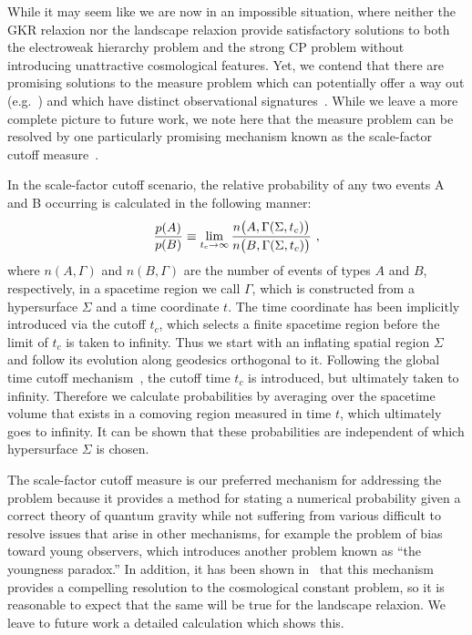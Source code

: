 \documentclass[12pt,aps,prd,showpacs,notitlepage,nofootinbib]{revtex4-1}
\newcommand{\beq}{\begin{equation}}
\newcommand{\eeq}{\end{equation}}
\begin{document}
While it may seem like we are now in an impossible situation, where neither the GKR relaxion nor the landscape relaxion provide satisfactory solutions to both the electroweak hierarchy problem and the strong CP problem without introducing unattractive cosmological features. Yet, we contend that there are promising solutions to the measure problem which can potentially offer a way out (e.g.~\cite{PhysRevD.50.730,PhysRevD.52.3365,PhysRevD.60.023501}) and which have distinct observational signatures~\cite{PhysRevD.78.063520}. While we leave a more complete picture to future work, we note here that the measure problem can be resolved by one particularly promising mechanism known as the scale-factor cutoff measure~\cite{PhysRevD.78.063520}.

In the scale-factor cutoff scenario, the relative probability of any two events A and B occurring is calculated in the following manner:
\beq
{p(A) \over p(B)} \equiv \lim_{t_c \to \infty} {{n\bigl(A,
\Gamma(\Sigma, t_c)\bigr)} \over {n\bigl(B, \Gamma(\Sigma,
t_c)\bigr)}} \ ,
\eeq
where $n(A,\Gamma)$ and $n(B,\Gamma)$ are the number of events of
types $A$ and $B$, respectively, in a spacetime region we call $\Gamma$, which is constructed from a hypersurface $\Sigma$ and a time coordinate $t$. The time coordinate has been implicitly introduced via the cutoff $t_{c}$, which selects a finite spacetime region before the limit of $t_{c}$ is taken to infinity. Thus we start with an inflating spatial region $\Sigma$ and follow its evolution along geodesics orthogonal to it. Following the global time cutoff mechanism~\cite{PhysRevD.50.730,PhysRevD.51.429,PhysRevD.52.6730}, the cutoff time $t_{c}$ is introduced, but ultimately taken to infinity. Therefore we calculate probabilities by averaging over the spacetime volume that exists in a comoving region measured in time $t$, which ultimately goes to infinity. It can be shown that these probabilities are independent of which hypersurface $\Sigma$ is chosen.

 The scale-factor cutoff measure is our preferred mechanism for addressing the problem because it provides a method for stating a numerical probability given a correct theory of quantum gravity while not suffering from various difficult to resolve issues that arise in other mechanisms, for example the problem of bias toward young observers, which introduces another problem known as ``the youngness paradox.'' In addition, it has been shown in~\cite{PhysRevD.78.063520} that this mechanism provides a compelling resolution to the cosmological constant problem, so it is reasonable to expect that the same will be true for the landscape relaxion. We leave to future work a detailed calculation which shows this.
\end{document}
